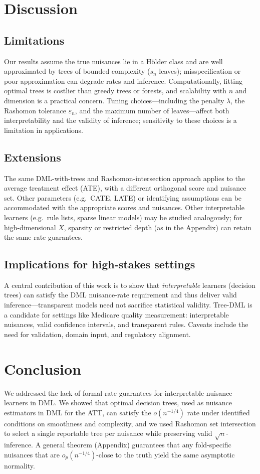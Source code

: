 \documentclass[12pt]{article}
\begin{document}
\section{Discussion}
\label{sec:discussion}

\subsection{Limitations}
Our results assume the true nuisances lie in a H\"older class and are well approximated by trees of bounded complexity ($s_n$ leaves); misspecification or poor approximation can degrade rates and inference. Computationally, fitting optimal trees is costlier than greedy trees or forests, and scalability with $n$ and dimension is a practical concern. Tuning choices---including the penalty $\lambda$, the Rashomon tolerance $\varepsilon_n$, and the maximum number of leaves---affect both interpretability and the validity of inference; sensitivity to these choices is a limitation in applications.

\subsection{Extensions}
The same DML-with-trees and Rashomon-intersection approach applies to the average treatment effect (ATE), with a different orthogonal score and nuisance set. Other parameters (e.g.\ CATE, LATE) or identifying assumptions can be accommodated with the appropriate scores and nuisances. Other interpretable learners (e.g.\ rule lists, sparse linear models) may be studied analogously; for high-dimensional $X$, sparsity or restricted depth (as in the Appendix) can retain the same rate guarantees.

\subsection{Implications for high-stakes settings}
A central contribution of this work is to show that \emph{interpretable} learners (decision trees) can satisfy the DML nuisance-rate requirement and thus deliver valid inference---transparent models need not sacrifice statistical validity. Tree-DML is a candidate for settings like Medicare quality measurement: interpretable nuisances, valid confidence intervals, and transparent rules. Caveats include the need for validation, domain input, and regulatory alignment.

\section{Conclusion}
\label{sec:conclusion}
We addressed the lack of formal rate guarantees for interpretable nuisance learners in DML. We showed that optimal decision trees, used as nuisance estimators in DML for the ATT, can satisfy the $o(n^{-1/4})$ rate under identified conditions on smoothness and complexity, and we used Rashomon set intersection to select a single reportable tree per nuisance while preserving valid $\sqrt{n}$-inference. A general theorem (Appendix) guarantees that any fold-specific nuisances that are $o_p(n^{-1/4})$-close to the truth yield the same asymptotic normality.
\end{document}
